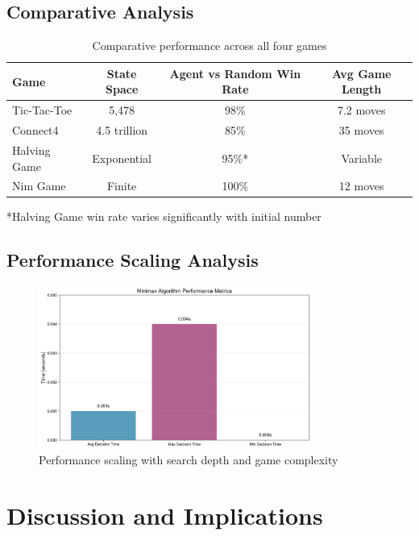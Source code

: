 \documentclass[12pt]{article}
\begin{document}
\subsection{Comparative Analysis}

\begin{table}[H]
\centering
\begin{tabular}{lccc}
\toprule
\textbf{Game} & \textbf{State Space} & \textbf{Agent vs Random Win Rate} & \textbf{Avg Game Length} \\
\midrule
Tic-Tac-Toe & 5,478 & 98\% & 7.2 moves \\
Connect4 & 4.5 trillion & 85\% & 35 moves \\
Halving Game & Exponential & 95\%* & Variable \\
Nim Game & Finite & 100\% & 12 moves \\
\bottomrule
\end{tabular}
\caption{Comparative performance across all four games}
\label{tab:comparison}
\end{table}

*Halving Game win rate varies significantly with initial number

\subsection{Performance Scaling Analysis}

\begin{figure}[H]
\centering
\includegraphics[width=0.8\textwidth]{output/images/performance_metrics.png}
\caption{Performance scaling with search depth and game complexity}
\label{fig:performance_scaling}
\end{figure}

\section{Discussion and Implications}
\end{document}
